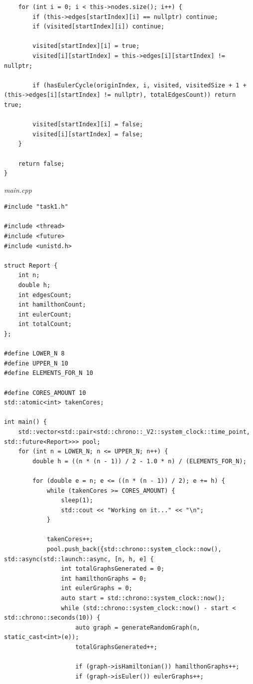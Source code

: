 \documentclass[a4paper,14pt]{extarticle}
\begin{document}
\begin{enumerate}[1.]
\begin{verbatim}
    for (int i = 0; i < this->nodes.size(); i++) {
        if (this->edges[startIndex][i] == nullptr) continue;
        if (visited[startIndex][i]) continue;

        visited[startIndex][i] = true;
        visited[i][startIndex] = this->edges[i][startIndex] != nullptr;

        if (hasEulerCycle(originIndex, i, visited, visitedSize + 1 + (this->edges[i][startIndex] != nullptr), totalEdgesCount)) return true;

        visited[startIndex][i] = false;
        visited[i][startIndex] = false;
    }

    return false;
}
\end{verbatim}

          \textit{main.cpp}
          \begin{verbatim}
#include "task1.h"

#include <thread>
#include <future>
#include <unistd.h>

struct Report {
    int n;
    double h;
    int edgesCount;
    int hamilthonCount;
    int eulerCount;
    int totalCount;
};

#define LOWER_N 8
#define UPPER_N 10
#define ELEMENTS_FOR_N 10

#define CORES_AMOUNT 10
std::atomic<int> takenCores;

int main() {
    std::vector<std::pair<std::chrono::_V2::system_clock::time_point, std::future<Report>>> pool;
    for (int n = LOWER_N; n <= UPPER_N; n++) {
        double h = ((n * (n - 1)) / 2 - 1.0 * n) / (ELEMENTS_FOR_N);
        
        for (double e = n; e <= ((n * (n - 1)) / 2); e += h) {
            while (takenCores >= CORES_AMOUNT) {
                sleep(1);
                std::cout << "Working on it..." << "\n";
            }

            takenCores++;
            pool.push_back({std::chrono::system_clock::now(), std::async(std::launch::async, [n, h, e] {
                int totalGraphsGenerated = 0;
                int hamilthonGraphs = 0;
                int eulerGraphs = 0;
                auto start = std::chrono::system_clock::now();
                while (std::chrono::system_clock::now() - start < std::chrono::seconds(10)) {
                    auto graph = generateRandomGraph(n, static_cast<int>(e));
                    totalGraphsGenerated++;

                    if (graph->isHamiltonian()) hamilthonGraphs++;
                    if (graph->isEuler()) eulerGraphs++;


\end{verbatim}
\end{enumerate}
\end{document}
